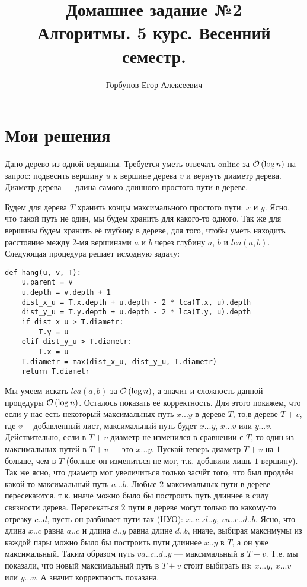 
\title{Домашнее задание №2 \\ Алгоритмы. 5 курс. Весенний семестр.}
\author{Горбунов Егор Алексеевич}


\maketitle

\section{Мои решения}

\begin{task}[1]
	Дано дерево из одной вершины. Требуется уметь отвечать online за $\mathcal{O}\left(\log{n}\right)$ на запрос: подвесить вершину $u$ к вершине дерева $v$ и вернуть диаметр дерева. Диаметр дерева --- длина самого длинного простого пути в дереве.
\end{task}
\begin{solution}
Будем для дерева $T$ хранить концы максимального простого пути: $x$ и $y$. Ясно, что такой путь не один, мы будем хранить для какого-то одного. Так же для вершины будем хранить её глубину в дереве, для того, чтобы уметь находить расстояние между $2$-мя вершинами $a$ и $b$ через глубину $a$, $b$ и $lca(a, b)$. Следующая процедура решает исходную задачу:
\begin{lstlisting}[]
def hang(u, v, T):
	u.parent = v
	u.depth = v.depth + 1
	dist_x_u = T.x.depth + u.depth - 2 * lca(T.x, u).depth
	dist_y_u = T.y.depth + u.depth - 2 * lca(T.y, u).depth
	if dist_x_u > T.diametr:
		T.y = u
	elif dist_y_u > T.diametr:
		T.x = u
	T.diametr = max(dist_x_u, dist_y_u, T.diametr)
	return T.diametr
\end{lstlisting}
Мы умеем искать $lca(a,b)$ за $\mathcal{O}\left(\log{n}\right)$, а значит и сложность данной процедуры $\mathcal{O}\left(\log{n}\right)$. Осталось показать её корректность. Для этого покажем, что если у нас есть некоторый максимальных путь $x...y$ в дереве $T$, то,в дереве $T+v$, где $v$--- добавленный лист, максимальный путь будет $x...y$, $x...v$ или $y...v$. Действительно, если в $T+v$ диаметр не изменился в сравнении с $T$, то один из максимальных путей в $T+v$ --- это $x...y$. Пускай теперь диаметр $T+v$ на $1$ больше, чем в $T$ (больше он измениться не мог, т.к. добавили лишь $1$ вершину). Так же ясно, что диаметр мог увеличиться только засчёт того, что был продлён какой-то максимальный путь $a...b$. Любые $2$ максимальных пути в дереве пересекаются, т.к. иначе можно было бы построить путь длиннее в силу связности дерева. Пересекаться $2$ пути в дереве могут только по какому-то отрезку $c..d$, пусть он разбивает пути так (НУО): $x..c..d..y$, $va..c..d..b$.
Ясно, что длина $x..c$ равна $a..c$ и длина $d..y$ равна длине $d..b$, иначе, выбирая максимумы из каждой пары можно было бы построить пути длиннее $x..y$ в $T$, а он уже максимальный. Таким образом путь $va..c..d..y$ --- максимальный в $T+v$. Т.е. мы показали, что новый максимальный путь в $T+v$ стоит выбирать из: $x...y$, $x...v$ или $y...v$. А значит корректность показана. \xqed
\end{solution}

